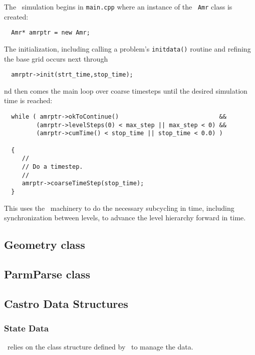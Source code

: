 The \castro\ simulation begins in {\tt main.cpp} where an instance
of the \boxlib\ {\tt Amr} class is created:
\begin{lstlisting}
  Amr* amrptr = new Amr;
\end{lstlisting}
The initialization, including calling a problem's {\tt initdata()}
routine and refining the base grid occurs next through
\begin{lstlisting}
  amrptr->init(strt_time,stop_time);
\end{lstlisting}
nd then comes the main loop over coarse timesteps until the
desired simulation time is reached:
\begin{lstlisting}
  while ( amrptr->okToContinue()                            &&
         (amrptr->levelSteps(0) < max_step || max_step < 0) &&
         (amrptr->cumTime() < stop_time || stop_time < 0.0) )

  {
     //
     // Do a timestep.
     //
     amrptr->coarseTimeStep(stop_time);
  }
\end{lstlisting}
This uses the \boxlib\ machinery to do the necessary subcycling in time,
including synchronization between levels, to advance the level hierarchy
forward in time.  

\subsection{Geometry class}

\subsection{ParmParse class}

\subsection{Castro Data Structures}

\subsubsection{State Data}

\castro\ relies on the class structure defined by \boxlib\ to manage the
data.


